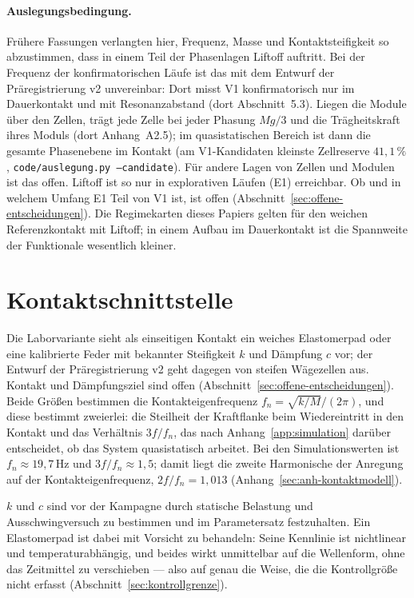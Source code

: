 \documentclass[12pt,a4paper]{report}
\begin{document}
\paragraph{Auslegungsbedingung.}
Frühere Fassungen verlangten hier, Frequenz, Masse und Kontaktsteifigkeit
so abzustimmen, dass in einem Teil der Phasenlagen Liftoff auftritt. Bei
der Frequenz der konfirmatorischen Läufe ist das mit dem Entwurf der
Präregistrierung v2 unvereinbar: Dort misst V1 konfirmatorisch nur im
Dauerkontakt und mit Resonanzabstand (dort Abschnitt~5.3). Liegen die
Module über den Zellen, trägt jede Zelle bei jeder Phasung $Mg/3$ und die
Trägheitskraft ihres Moduls (dort Anhang~A2.5); im quasistatischen
Bereich ist dann die gesamte Phasenebene im Kontakt (am V1-Kandidaten
kleinste Zellreserve $41{,}1\,\%$, \texttt{code/auslegung.py --candidate}).
Für andere Lagen von Zellen und Modulen ist das offen. Liftoff ist so nur
in explorativen Läufen (E1) erreichbar. Ob und in welchem Umfang E1 Teil
von V1 ist, ist offen (Abschnitt~\ref{sec:offene-entscheidungen}). Die Regimekarten dieses
Papiers gelten für den weichen Referenzkontakt mit Liftoff; in einem Aufbau
im Dauerkontakt ist die Spannweite der Funktionale wesentlich kleiner.

\section{Kontaktschnittstelle}
\label{sec:kontaktschnittstelle}

Die Laborvariante sieht als einseitigen Kontakt ein weiches Elastomerpad
oder eine kalibrierte Feder mit bekannter Steifigkeit $k$ und Dämpfung
$c$ vor; der Entwurf der Präregistrierung v2 geht dagegen von steifen
Wägezellen aus. Kontakt und Dämpfungsziel sind offen
(Abschnitt~\ref{sec:offene-entscheidungen}). Beide
Größen bestimmen die Kontakteigenfrequenz
$f_n = \sqrt{k/M}/(2\pi)$, und diese bestimmt zweierlei: die Steilheit
der Kraftflanke beim Wiedereintritt in den Kontakt und das Verhältnis
$3f/f_n$, das nach Anhang~\ref{app:simulation} darüber entscheidet, ob
das System quasistatisch arbeitet. Bei den Simulationswerten ist
$f_n \approx 19{,}7\,\mathrm{Hz}$ und $3f/f_n \approx 1{,}5$; damit liegt die
zweite Harmonische der Anregung auf der Kontakteigenfrequenz,
$2f/f_n = 1{,}013$ (Anhang~\ref{sec:anh-kontaktmodell}).

$k$ und $c$ sind vor der Kampagne durch statische Belastung und
Ausschwingversuch zu bestimmen und im Parametersatz festzuhalten. Ein
Elastomerpad ist dabei mit Vorsicht zu behandeln: Seine Kennlinie ist
nichtlinear und temperaturabhängig, und beides wirkt unmittelbar auf die
Wellenform, ohne das Zeitmittel zu verschieben --- also auf genau die
Weise, die die Kontrollgröße nicht erfasst
(Abschnitt~\ref{sec:kontrollgrenze}).
\end{document}
